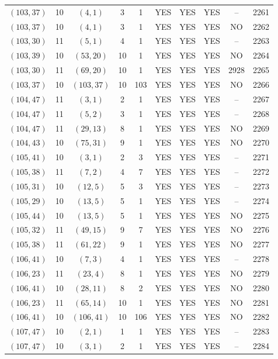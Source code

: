 \begin{longtable}{|c|c|c|c|c|c|c|c|c|c|}
$(103, 37)$ & 10 & $(4, 1)$ & 3 & 1 & YES & YES & YES & -- & 2261\\
$(103, 37)$ & 10 & $(4, 1)$ & 3 & 1 & YES & YES & YES & NO & 2262\\
$(103, 30)$ & 11 & $(5, 1)$ & 4 & 1 & YES & YES & YES & -- & 2263\\
$(103, 39)$ & 10 & $(53, 20)$ & 10 & 1 & YES & YES & YES & NO & 2264\\
$(103, 30)$ & 11 & $(69, 20)$ & 10 & 1 & YES & YES & YES & 2928 & 2265\\
$(103, 37)$ & 10 & $(103, 37)$ & 10 & 103 & YES & YES & YES & NO & 2266\\
$(104, 47)$ & 11 & $(3, 1)$ & 2 & 1 & YES & YES & YES & -- & 2267\\
$(104, 47)$ & 11 & $(5, 2)$ & 3 & 1 & YES & YES & YES & -- & 2268\\
$(104, 47)$ & 11 & $(29, 13)$ & 8 & 1 & YES & YES & YES & NO & 2269\\
$(104, 43)$ & 10 & $(75, 31)$ & 9 & 1 & YES & YES & YES & NO & 2270\\
$(105, 41)$ & 10 & $(3, 1)$ & 2 & 3 & YES & YES & YES & -- & 2271\\
$(105, 38)$ & 11 & $(7, 2)$ & 4 & 7 & YES & YES & YES & -- & 2272\\
$(105, 31)$ & 10 & $(12, 5)$ & 5 & 3 & YES & YES & YES & -- & 2273\\
$(105, 29)$ & 10 & $(13, 5)$ & 5 & 1 & YES & YES & YES & -- & 2274\\
$(105, 44)$ & 10 & $(13, 5)$ & 5 & 1 & YES & YES & YES & NO & 2275\\
$(105, 32)$ & 11 & $(49, 15)$ & 9 & 7 & YES & YES & YES & NO & 2276\\
$(105, 38)$ & 11 & $(61, 22)$ & 9 & 1 & YES & YES & YES & NO & 2277\\
$(106, 41)$ & 10 & $(7, 3)$ & 4 & 1 & YES & YES & YES & -- & 2278\\
$(106, 23)$ & 11 & $(23, 4)$ & 8 & 1 & YES & YES & YES & NO & 2279\\
$(106, 41)$ & 10 & $(28, 11)$ & 8 & 2 & YES & YES & YES & NO & 2280\\
$(106, 23)$ & 11 & $(65, 14)$ & 10 & 1 & YES & YES & YES & NO & 2281\\
$(106, 41)$ & 10 & $(106, 41)$ & 10 & 106 & YES & YES & YES & NO & 2282\\
$(107, 47)$ & 10 & $(2, 1)$ & 1 & 1 & YES & YES & YES & -- & 2283\\
$(107, 47)$ & 10 & $(3, 1)$ & 2 & 1 & YES & YES & YES & -- & 2284\\

\end{longtable}

